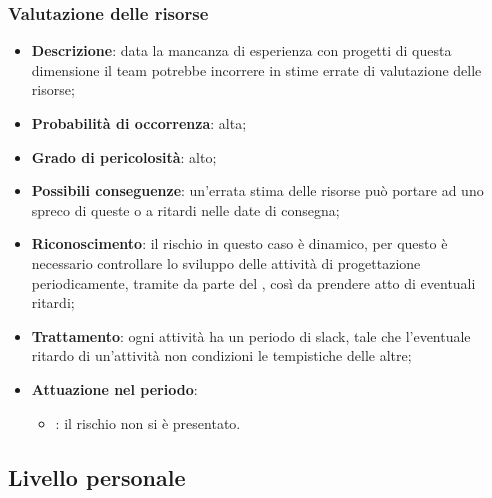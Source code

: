\documentclass[PianoDiProgetto.tex]{subfiles}
\begin{document}
	\subsubsection{Valutazione delle risorse}
		\label{sec:lo}
		\begin{itemize}
		\item \textbf{Descrizione}: data la mancanza di esperienza con progetti di questa dimensione il team potrebbe incorrere in stime errate di valutazione delle risorse;
		\item \textbf{Probabilità di occorrenza}: alta;
		\item \textbf{Grado di pericolosità}: alto;
		\item \textbf{Possibili conseguenze}: un'errata stima delle risorse può portare ad uno spreco di queste o a ritardi nelle date di consegna;
		\item \textbf{Riconoscimento}: il rischio in questo caso è dinamico, per questo è necessario controllare lo sviluppo delle attività di progettazione periodicamente, tramite   da parte del \RESP{}, così da prendere atto di eventuali ritardi;
		\item \textbf{Trattamento}: ogni attività ha un periodo di slack, tale che l'eventuale ritardo di un'attività non condizioni le tempistiche delle altre;
		\item \textbf{Attuazione nel periodo}: 
			\begin{itemize}
				\item \PerAR : il rischio non si è presentato.
			\end{itemize}
	\end{itemize}
	
	\subsection{Livello personale}
\end{document}

